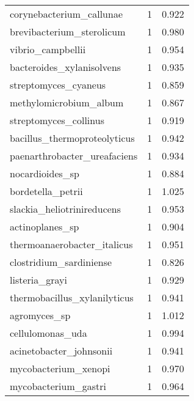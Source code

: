 \begin{tabular}{lrr}
                    corynebacterium\_callunae &                   1 &     0.922 \\
                   brevibacterium\_sterolicum &                   1 &     0.980 \\
                           vibrio\_campbellii &                   1 &     0.954 \\
                   bacteroides\_xylanisolvens &                   1 &     0.935 \\
                        streptomyces\_cyaneus &                   1 &     0.859 \\
                      methylomicrobium\_album &                   1 &     0.867 \\
                       streptomyces\_collinus &                   1 &     0.919 \\
                bacillus\_thermoproteolyticus &                   1 &     0.942 \\
                paenarthrobacter\_ureafaciens &                   1 &     0.934 \\
                             nocardioides\_sp &                   1 &     0.884 \\
                           bordetella\_petrii &                   1 &     1.025 \\
                  slackia\_heliotrinireducens &                   1 &     0.953 \\
                             actinoplanes\_sp &                   1 &     0.904 \\
                 thermoanaerobacter\_italicus &                   1 &     0.951 \\
                     clostridium\_sardiniense &                   1 &     0.826 \\
                              listeria\_grayi &                   1 &     0.929 \\
                thermobacillus\_xylanilyticus &                   1 &     0.941 \\
                                agromyces\_sp &                   1 &     1.012 \\
                            cellulomonas\_uda &                   1 &     0.994 \\
                     acinetobacter\_johnsonii &                   1 &     0.941 \\
                        mycobacterium\_xenopi &                   1 &     0.970 \\
                        mycobacterium\_gastri &                   1 &     0.964 \\

\end{tabular}
